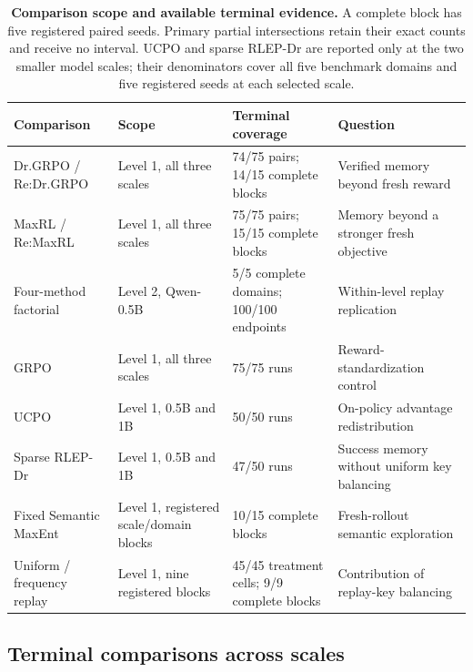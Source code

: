 \documentclass{article}
\newcommand{\1}{\mathbf 1}
\theoremstyle{remark}
\theoremstyle{definition}
\theoremstyle{plain}
\begin{document}
\begin{table}[H]
  \centering
  \caption{\textbf{Comparison scope and available terminal evidence.}
  A complete block has five registered paired seeds. Primary partial
  intersections retain their exact counts and receive no interval.
  UCPO and sparse RLEP-Dr are reported only at the two smaller model scales;
  their denominators cover all five benchmark domains and five registered
  seeds at each selected scale.}
  \label{tab:experiment-map}
  \label{tab:direct-comparators}
  \scriptsize
  \setlength{\tabcolsep}{3pt}
  \begin{tabularx}{\linewidth}{@{}P{.24\linewidth}P{.20\linewidth}P{.22\linewidth}Y@{}}
    \toprule
    \textbf{Comparison} & \textbf{Scope} & \textbf{Terminal coverage}
      & \textbf{Question} \\
    \midrule
    Dr.GRPO / Re:Dr.GRPO & Level 1, all three scales &
      74/75 pairs; 14/15 complete blocks & Verified memory beyond fresh reward \\
    MaxRL / Re:MaxRL & Level 1, all three scales &
      75/75 pairs; 15/15 complete blocks & Memory beyond a stronger fresh objective \\
    Four-method factorial & Level 2, Qwen-0.5B &
      5/5 complete domains; 100/100 endpoints & Within-level replay replication \\
    GRPO & Level 1, all three scales &
      75/75 runs & Reward-standardization control \\
    UCPO & Level 1, 0.5B and 1B &
      50/50 runs & On-policy advantage redistribution \\
    Sparse RLEP-Dr & Level 1, 0.5B and 1B &
      47/50 runs & Success memory without uniform key balancing \\
    Fixed Semantic MaxEnt & Level 1, registered scale/domain blocks &
      10/15 complete blocks & Fresh-rollout semantic exploration \\
    Uniform / frequency replay & Level 1, nine registered blocks &
      45/45 treatment cells; 9/9 complete blocks & Contribution of replay-key balancing \\
    \bottomrule
  \end{tabularx}
\end{table}


\subsection{Terminal comparisons across scales}
\label{app:scale-matrix}
\label{app:scale-snapshot}
\label{app:maxrl-scale-extensions}
\label{app:current-campaign-results}
\end{document}
